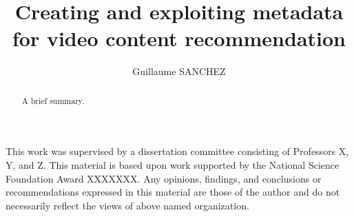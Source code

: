 \documentclass[11pt,leqno]{report}
\begin{document}
\lstset{style=mystyle}

\newcommand{\IE}{\mathbb{E}}
\sloppy
\title{Creating and exploiting metadata for video content recommendation}
\author{Guillaume SANCHEZ}
\maketitle

\thispagestyle{empty}
\newenvironment{dedication}
{\cleardoublepage \thispagestyle{empty} 
  \begin{center} \em}
  {\end{center}  }
\begin{dedication}


\end{dedication}



\begin{abstract}

  A brief summary.
  
\end{abstract}



\begin{contributors}

This work was supervised by a dissertation committee consisting of Professors
X, Y, and Z. 
This material is based upon work supported by the National Science Foundation Award
XXXXXXX.  Any opinions, findings, and conclusions or recommendations
expressed in this material are those of the author and do not necessarily
reflect the views of above named organization.

\end{contributors}
\end{document}
